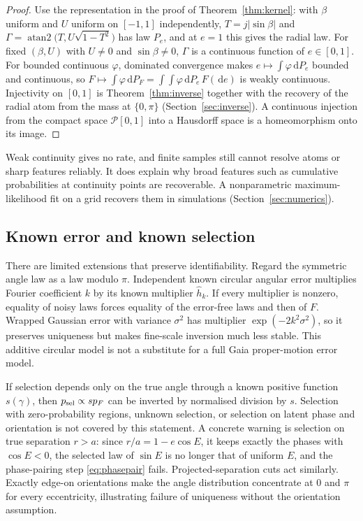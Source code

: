 \documentclass[11pt,a4paper]{article}
\theoremstyle{remark}\newtheorem{remark}[theorem]{Remark}
\newcommand{\dd}{\,\mathrm d}
\begin{document}
\begin{proof}
Use the representation in the proof of Theorem~\ref{thm:kernel}: with $\beta$ uniform and $U$ uniform on $[-1,1]$ independently, $T=j|\sin\beta|$ and $\Gamma=\operatorname{atan2}\big(T,U\sqrt{1-T^2}\big)$ has law $P_e$, and at $e=1$ this gives the radial law. For fixed $(\beta,U)$ with $U\ne0$ and $\sin\beta\ne0$, $\Gamma$ is a continuous function of $e\in[0,1]$. For bounded continuous $\varphi$, dominated convergence makes $e\mapsto\int\varphi\dd P_e$ bounded and continuous, so $F\mapsto\int\varphi\dd P_F=\int\!\int\varphi\dd P_e\,F(\dd e)$ is weakly continuous. Injectivity on $[0,1]$ is Theorem~\ref{thm:inverse} together with the recovery of the radial atom from the mass at $\{0,\pi\}$ (Section~\ref{sec:inverse}). A continuous injection from the compact space $\mathcal P[0,1]$ into a Hausdorff space is a homeomorphism onto its image.
\end{proof}

Weak continuity gives no rate, and finite samples still cannot resolve atoms or sharp features reliably. It does explain why broad features such as cumulative probabilities at continuity points are recoverable. A nonparametric maximum-likelihood fit on a grid recovers them in simulations (Section~\ref{sec:numerics}).

\subsection{Known error and known selection}

There are limited extensions that preserve identifiability. Regard the symmetric angle law as a law modulo $\pi$. Independent known circular angular error multiplies Fourier coefficient $k$ by its known multiplier $\widehat h_k$. If every multiplier is nonzero, equality of noisy laws forces equality of the error-free laws and then of $F$. Wrapped Gaussian error with variance $\sigma^2$ has multiplier $\exp(-2k^2\sigma^2)$, so it preserves uniqueness but makes fine-scale inversion much less stable. This additive circular model is not a substitute for a full Gaia proper-motion error model.

If selection depends only on the true angle through a known positive function $s(\gamma)$, then $p_{\rm sel}\propto s p_F$ can be inverted by normalised division by $s$. Selection with zero-probability regions, unknown selection, or selection on latent phase and orientation is not covered by this statement. A concrete warning is selection on true separation $r>a$: since $r/a=1-e\cos E$, it keeps exactly the phases with $\cos E<0$, the selected law of $\sin E$ is no longer that of uniform $E$, and the phase-pairing step \eqref{eq:phasepair} fails. Projected-separation cuts act similarly. Exactly edge-on orientations make the angle distribution concentrate at $0$ and $\pi$ for every eccentricity, illustrating failure of uniqueness without the orientation assumption.
\end{document}
